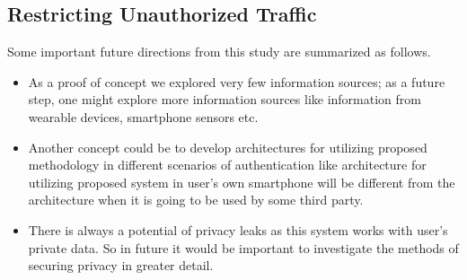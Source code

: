\subsection{Restricting Unauthorized Traffic} Some important future directions from this study are summarized as follows.
\begin{itemize}
\item As a proof of concept we explored very few information sources; as a future step, one might explore more information sources like information from wearable devices, smartphone sensors etc.\\
\item Another concept could be to develop architectures for utilizing proposed methodology in different scenarios of authentication like architecture for utilizing proposed system in user's own smartphone will be different from the architecture when it is going to be used by some third party.\\
\item There is always a potential of privacy leaks as this system works with user's private data. So in future it would be important to investigate the methods of securing privacy in greater detail.\\
\end{itemize}
